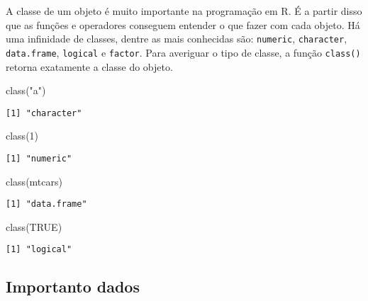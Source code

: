 \documentclass[
  12pt,
  letterpaper,
  DIV=11,
  numbers=noendperiod]{scrreprt}
\newenvironment{Shaded}{\begin{snugshade}}{\end{snugshade}}
\newcommand{\ConstantTok}[1]{\textcolor[rgb]{0.56,0.35,0.01}{#1}}
\newcommand{\DecValTok}[1]{\textcolor[rgb]{0.68,0.00,0.00}{#1}}
\newcommand{\FunctionTok}[1]{\textcolor[rgb]{0.28,0.35,0.67}{#1}}
\newcommand{\NormalTok}[1]{\textcolor[rgb]{0.00,0.23,0.31}{#1}}
\newcommand{\StringTok}[1]{\textcolor[rgb]{0.13,0.47,0.30}{#1}}
\begin{document}
A classe de um objeto é muito importante na programação em R. É a partir
disso que as funções e operadores conseguem entender o que fazer com
cada objeto. Há uma infinidade de classes, dentre as mais conhecidas
são: \texttt{numeric}, \texttt{character}, \texttt{data.frame},
\texttt{logical} e \texttt{factor}. Para averiguar o tipo de classe, a
função \texttt{class()} retorna exatamente a classe do objeto.

\begin{Shaded}
\begin{Highlighting}[]
\FunctionTok{class}\NormalTok{(}\StringTok{"a"}\NormalTok{)}
\end{Highlighting}
\end{Shaded}

\begin{verbatim}
[1] "character"
\end{verbatim}

\begin{Shaded}
\begin{Highlighting}[]
\FunctionTok{class}\NormalTok{(}\DecValTok{1}\NormalTok{)}
\end{Highlighting}
\end{Shaded}

\begin{verbatim}
[1] "numeric"
\end{verbatim}

\begin{Shaded}
\begin{Highlighting}[]
\FunctionTok{class}\NormalTok{(mtcars)}
\end{Highlighting}
\end{Shaded}

\begin{verbatim}
[1] "data.frame"
\end{verbatim}

\begin{Shaded}
\begin{Highlighting}[]
\FunctionTok{class}\NormalTok{(}\ConstantTok{TRUE}\NormalTok{)}
\end{Highlighting}
\end{Shaded}

\begin{verbatim}
[1] "logical"
\end{verbatim}

\subsection{Importanto dados}\label{importanto-dados}
\end{document}
